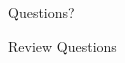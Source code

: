 \documentclass[fleqn,aspectratio=169]{beamer}
\begin{document}
\begin{frame}{}
\vspace{2cm}
\LARGE Questions?


\end{frame}

\begin{frame}{Review Questions}
\bce[1)]
\item 

\ece
\end{frame}
\end{document}
